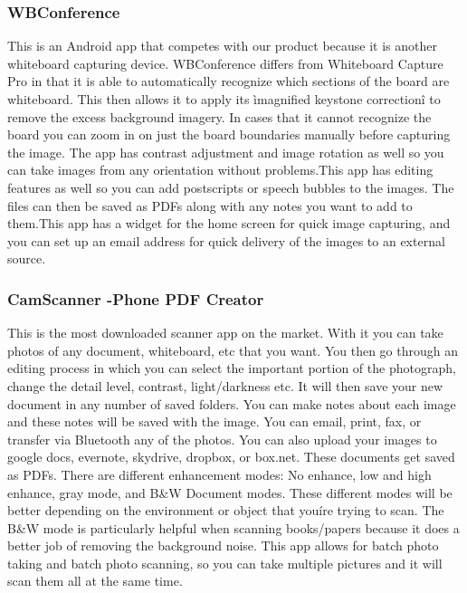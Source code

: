 \documentclass{article}
\begin{document}
				\subsubsection*{WBConference}
					
This is an Android app that competes with our product because it is another whiteboard capturing device. WBConference differs from Whiteboard Capture Pro in that it is able to automatically recognize which sections of the board are whiteboard. This then allows it to apply its ìmagnified keystone correctionî to remove the excess background imagery. In cases that it cannot recognize the board you can zoom in on just the board boundaries manually before capturing the image. The app has contrast adjustment and image rotation as well so you can take images from any orientation without problems.This app has editing features as well so you can add postscripts or speech bubbles to the images. The files can then be saved as PDFs along with any notes you want to add to them.This app has a widget for the home screen for quick image capturing, and you can set up an email address for quick delivery of the images to an external source. \cite{wbc} \\
				\subsubsection*{CamScanner -Phone PDF Creator}
					
This is the most downloaded scanner app on the market. With it you can take photos of any document, whiteboard, etc that you want. You then go through an editing process in which you can select the important portion of the photograph, change the detail level, contrast, light/darkness etc. It will then save your new document in any number of saved folders. You can make notes about each image and these notes will be saved with the image. You can email, print, fax, or transfer via Bluetooth any of the photos. You can also upload your images to google docs, evernote, skydrive, dropbox, or box.net. These documents get saved as PDFs. There are different enhancement modes: No enhance, low and high enhance, gray mode, and B\&W Document modes. These different modes will be better depending on the environment or object that youíre trying to scan. The B\&W mode is particularly helpful when scanning books/papers because it does a better job of removing the background noise. This app allows for batch photo taking and batch photo scanning, so you can take multiple pictures and it will scan them all at the same time. \cite{camscan} \\
\end{document}
